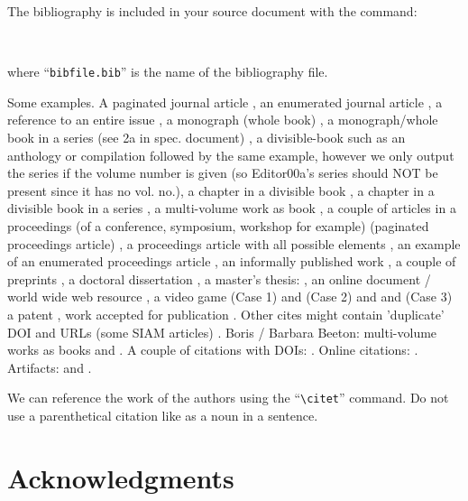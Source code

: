 \documentclass[]{jair}
\begin{document}
The bibliography is included in your source document with the command:
\begin{verbatim}
    
\end{verbatim}
where ``\verb|bibfile.bib|'' is the name of the bibliography file.


  Some examples.  A paginated journal article \cite{Abril07}, an
  enumerated journal article \cite{Cohen07}, a reference to an entire
  issue \cite{JCohen96}, a monograph (whole book) \cite{Kosiur01}, a
  monograph/whole book in a series (see 2a in spec. document)
  \cite{Harel79}, a divisible-book such as an anthology or compilation
  \cite{Editor00} followed by the same example, however we only output
  the series if the volume number is given \cite{Editor00a} (so
  Editor00a's series should NOT be present since it has no vol. no.),
  a chapter in a divisible book \cite{Spector90}, a chapter in a
  divisible book in a series \cite{Douglass98}, a multi-volume work as
  book \cite{Knuth97}, a couple of articles in a proceedings (of a
  conference, symposium, workshop for example) (paginated proceedings
  article) \cite{Andler79, Hagerup1993}, a proceedings article with
  all possible elements \cite{Smith10}, an example of an enumerated
  proceedings article \cite{VanGundy07}, an informally published work
  \cite{Harel78}, a couple of preprints \cite{Bornmann2019,
    AnzarootPBM14}, a doctoral dissertation \cite{Clarkson85}, a
  master's thesis: \cite{anisi03}, an online document / world wide web
  resource \cite{Thornburg01, Ablamowicz07, Poker06}, a video game
  (Case 1) \cite{Obama08} and (Case 2) \cite{Novak03} and \cite{Lee05}
  and (Case 3) a patent \cite{JoeScientist001}, work accepted for
  publication \cite{rous08}. Other cites might
  contain 'duplicate' DOI and URLs (some SIAM articles)
  \cite{Kirschmer:2010:AEI:1958016.1958018}. Boris / Barbara Beeton:
  multi-volume works as books \cite{MR781536} and \cite{MR781537}. A
  couple of citations with DOIs:
  \cite{2004:ITE:1009386.1010128,Kirschmer:2010:AEI:1958016.1958018}. Online
  citations: \cite{TUGInstmem, Thornburg01, CTANacmart}.
  Artifacts: \cite{R} and \cite{UMassCitations}.

  We can reference the work of the authors \cite{Abril07} using the ``\verb|\citet|'' command. Do not use a parenthetical citation like \cite{Abril07} as a noun in a sentence.

\section{Acknowledgments}
\end{document}
